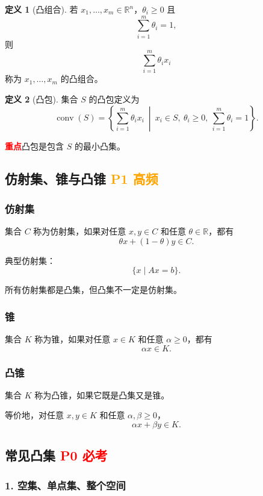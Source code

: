 \documentclass[11pt,a4paper]{ctexart}
\newcommand{\R}{\mathbb{R}}
\newcommand{\conv}{\operatorname{conv}}
\newcommand{\Pzero}{\textcolor{red}{\textbf{P0 必考}}}
\newcommand{\Pone}{\textcolor{orange}{\textbf{P1 高频}}}
\newcommand{\key}{\textcolor{red}{\textbf{重点}}}
\theoremstyle{definition}
\newtheorem{definition}{定义}[section]
\theoremstyle{plain}
\theoremstyle{remark}
\begin{document}
\begin{definition}[凸组合]
若 $x_1,\dots,x_m\in\R^n$，$\theta_i\ge0$ 且
\[
    \sum_{i=1}^m \theta_i=1,
\]
则
\[
    \sum_{i=1}^m \theta_i x_i
\]
称为 $x_1,\dots,x_m$ 的凸组合。
\end{definition}

\begin{definition}[凸包]
集合 $S$ 的凸包定义为
\[
    \conv(S)
    =
    \left\{
    \sum_{i=1}^m \theta_i x_i
    \ \middle|\
    x_i\in S,\ \theta_i\ge0,\ \sum_{i=1}^m\theta_i=1
    \right\}.
\]
\end{definition}

\key{凸包是包含 $S$ 的最小凸集。}

\subsection{仿射集、锥与凸锥 \Pone}

\subsubsection*{仿射集}

集合 $C$ 称为仿射集，如果对任意 $x,y\in C$ 和任意 $\theta\in\R$，都有
\[
    \theta x+(1-\theta)y\in C.
\]

典型仿射集：
\[
    \{x\mid Ax=b\}.
\]

所有仿射集都是凸集，但凸集不一定是仿射集。

\subsubsection*{锥}

集合 $K$ 称为锥，如果对任意 $x\in K$ 和任意 $\alpha\ge0$，都有
\[
    \alpha x\in K.
\]

\subsubsection*{凸锥}

集合 $K$ 称为凸锥，如果它既是凸集又是锥。

等价地，对任意 $x,y\in K$ 和任意 $\alpha,\beta\ge0$，
\[
    \alpha x+\beta y\in K.
\]

\subsection{常见凸集 \Pzero}

\subsubsection*{1. 空集、单点集、整个空间}
\end{document}
